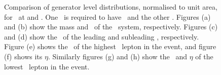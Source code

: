 \begin{figure}
{    }
        \vspace{-2mm}
        \vspace{-2mm}
    \caption[Comparison of generator level distributions, normalised to
    unit area, for \ZZsllll\ at  and
    .]{\small Comparison of generator level distributions, normalised to
    unit area, for \ZZsllll\ at  and
    . One \Z\ is required to have \sstooosZ\ and the other
    \mZgtt. Figures (a)
    and (b) show the mass and \pt\ of the \ZZ\ system,
    respectively. Figures (c) and (d) show the \pt\ of the
    leading and subleading \Z, respectively. Figure (e) shows the \pt\ of the highest \pt\ lepton in the event, and figure (f) shows its
   $\eta$. Similarly figures (g) and (h) show the \pt\ and $\eta$ of the lowest
   \pt\ lepton in the event.}
    \label{fig:gen-comp-7-8-ZZs}
\end{figure}

